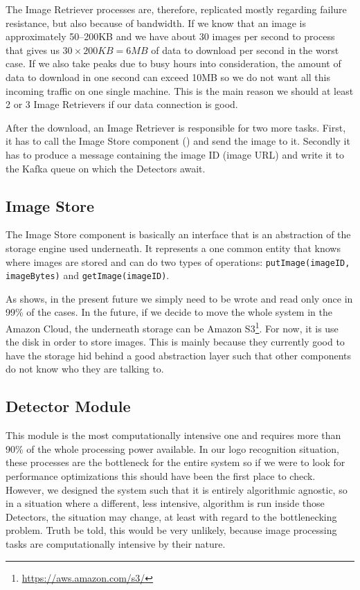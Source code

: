 The Image Retriever processes are, therefore, replicated mostly regarding
failure resistance, but also because of bandwidth. If we know that an image is
approximately 50--200KB and we have about 30 images per second to process that
gives us \(30 \times 200KB = 6MB\) of data to download per second in the worst
case. If we also take peaks due to busy hours into consideration, the amount
of data to download in one second can exceed 10MB so we do not want all this
incoming traffic on one single machine. This is the main reason we should at
least 2 or 3 Image Retrievers if our data connection is good.

After the download, an Image Retriever is responsible for two more tasks.
First, it has to call the Image Store component
() and send the image to it.
Secondly it has to produce a message containing the image ID (image URL) and
write it to the Kafka queue on which the Detectors await.

\subsection{Image Store}
\label{sub-sec:im-store}

The Image Store component is basically an interface that is an abstraction of
the storage engine used underneath. It represents a one common entity that
knows where images are stored and can do two types of operations:
\texttt{putImage(imageID, imageBytes)} and \texttt{getImage(imageID)}.

As  shows, in the present future we simply
need to be wrote and read only once in 99\% of the cases. In the future, if we
decide to move the whole system in the Amazon Cloud, the underneath storage
can be Amazon S3\footnote{\url{https://aws.amazon.com/s3/}}. For now, it is
use the disk in order to store images. This is mainly because they currently
good to have the storage hid behind a good abstraction layer such that other
components do not know who they are talking to.

\subsection{Detector Module}
\label{sub-sec:detector}

This module is the most computationally intensive one and requires more than
90\% of the whole processing power available. In our logo recognition
situation, these processes are the bottleneck for the entire system so if we
were to look for performance optimizations this should have been the first place to
check. However, we designed the system such that it is entirely algorithmic
agnostic, so in a situation where a different, less intensive, algorithm is
run inside those Detectors, the situation may change, at least with regard to
the bottlenecking problem. Truth be told, this would be very unlikely, because
image processing tasks are computationally intensive by their nature.

